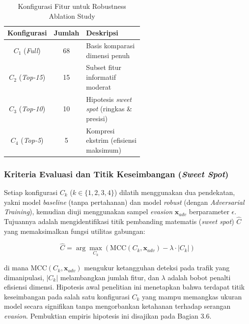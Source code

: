 \documentclass[11pt, a4paper]{article}
\begin{document}

\begin{table}[htbp]
\caption{Konfigurasi Fitur untuk Robustness Ablation Study}
\label{tab:ablation_configurations}
\centering
\vspace{0.2cm}
\small
\begin{tabular}{@{}c c p{0.55\linewidth}@{}}
\toprule
\textbf{Konfigurasi} & \textbf{Jumlah} & \textbf{Deskripsi} \\ \midrule
$C_1$ (\textit{Full}) & 68 & Basis komparasi dimensi penuh \\ \addlinespace
$C_2$ (\textit{Top-15}) & 15 & Subset fitur informatif moderat \\ \addlinespace
$C_3$ (\textit{Top-10}) & 10 & Hipotesis \textit{sweet spot} (ringkas \& presisi) \\ \addlinespace
$C_4$ (\textit{Top-5}) & 5 & Kompresi ekstrim (efisiensi maksimum) \\ \bottomrule
\end{tabular}
\end{table}


\subsubsection{Kriteria Evaluasi dan Titik Keseimbangan (\textit{Sweet Spot})}
Setiap konfigurasi $C_k$ ($k \in \{1, 2, 3, 4\}$) dilatih menggunakan dua pendekatan, yakni model \textit{baseline} (tanpa pertahanan) dan model \textit{robust} (dengan \textit{Adversarial Training}), kemudian diuji menggunakan sampel \textit{evasion} $\mathbf{x}_{adv}$ berparameter $\epsilon$. Tujuannya adalah mengidentifikasi titik pembanding matematis (\textit{sweet spot}) $\hat{C}$ yang memaksimalkan fungsi utilitas gabungan:

\begin{equation}
\hat{C} = \arg\max_{C_k} \left( \text{MCC}(C_k, \mathbf{x}_{adv}) - \lambda \cdot |C_k| \right)
\end{equation}

di mana $\text{MCC}(C_k, \mathbf{x}_{adv})$ mengukur ketangguhan deteksi pada trafik yang dimanipulasi, $|C_k|$ melambangkan jumlah fitur, dan $\lambda$ adalah bobot penalti efisiensi dimensi. Hipotesis awal penelitian ini menetapkan bahwa terdapat titik keseimbangan pada salah satu konfigurasi $C_k$ yang mampu memangkas ukuran model secara signifikan tanpa mengorbankan ketahanan terhadap serangan \textit{evasion}. Pembuktian empiris hipotesis ini disajikan pada Bagian 3.6.
\end{document}
